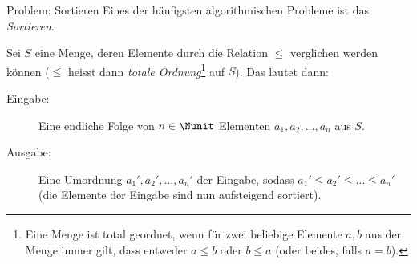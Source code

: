 

\begin{frame}{Problem: Sortieren}
Eines der häufigsten algorithmischen Probleme ist das \textit{Sortieren}.
\begin{mydefinition}[Sortierproblem]\label{mydefinition:Sortierproblem}
Sei $S$ eine Menge, deren Elemente durch die Relation $\leq$ verglichen werden können ($\leq$ heisst dann \textit{totale Ordnung}\footnote{Eine Menge ist total geordnet, wenn für zwei beliebige Elemente $a, b$ aus der Menge immer gilt, dass entweder $a \leq b$ oder $b \leq a$ (oder beides, falls $a=b$).} auf $S$). Das  lautet dann:
\begin{description}
	\item[Eingabe:] Eine endliche Folge von $n\in\Nunit$ Elementen $a_1, a_2,\ldots, a_n$ aus $S$.
	\item[Ausgabe:] Eine Umordnung $a_1', a_2', \ldots, a_n'$ der Eingabe, sodass $a_1'\leq a_2' \leq \ldots \leq a_n'$ (die Elemente der Eingabe sind nun aufsteigend sortiert).
\end{description}
\end{mydefinition}
\end{frame}



